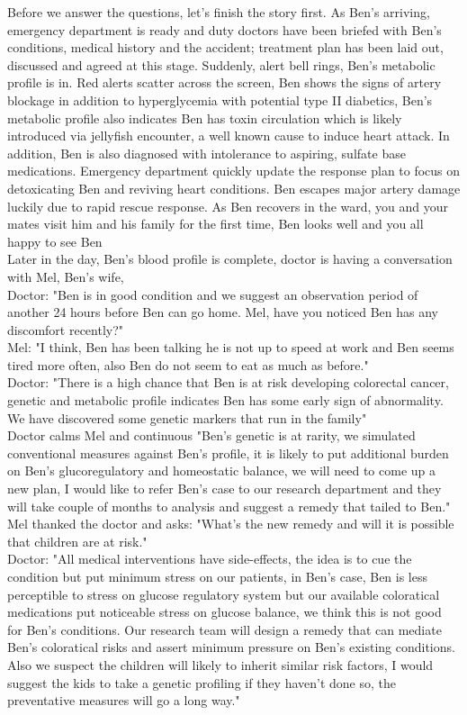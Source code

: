 Before we answer the questions, let's finish the story first. As Ben's arriving, emergency department is ready and duty doctors have been briefed with Ben's conditions, medical history and the accident; treatment plan has been laid out, discussed and agreed at this stage. Suddenly, alert bell rings, Ben's metabolic profile is in. Red alerts scatter across the screen, Ben shows the signs of artery blockage in addition to hyperglycemia with potential type II diabetics, Ben's metabolic profile also indicates Ben has toxin circulation which is likely introduced via jellyfish encounter, a well known cause to induce heart attack. In addition, Ben is also diagnosed with intolerance to aspiring, sulfate base medications. Emergency department quickly update the response plan to focus on  detoxicating Ben and reviving heart conditions. Ben escapes major artery damage luckily due to rapid rescue response. As Ben recovers in the ward, you and your mates visit him and his family for the first time, Ben looks well and you all happy to see Ben \\
Later in the day, Ben's blood profile is complete, doctor is having a conversation with Mel, Ben's wife, \\
Doctor: "Ben is in good condition and we suggest an observation period of another 24 hours before Ben can go home. Mel, have you noticed Ben has any discomfort recently?" \\
Mel: "I think, Ben has been talking he is not up to speed at work and Ben seems tired more often, also Ben do not seem to eat as much as before." \\
Doctor: "There is a high chance that Ben is at risk developing colorectal cancer, genetic and metabolic profile indicates Ben has some early sign of abnormality. We have discovered some genetic markers that run in the family" \\
Doctor calms Mel and continuous "Ben's genetic is at rarity, we simulated conventional measures against Ben's profile, it is likely to put additional burden on Ben's glucoregulatory and homeostatic balance, we will need to come up a new plan, I would like to refer Ben's case to our research department and they will take couple of months to analysis and suggest a remedy that tailed to Ben." \\
Mel thanked the doctor and asks: "What's the new remedy and will it is possible that children are at risk." \\
Doctor: "All medical interventions have side-effects, the idea is to cue the condition but put minimum stress on our patients, in Ben's case, Ben is less perceptible to stress on glucose regulatory system but our available coloratical medications put noticeable stress on glucose balance, we think this is not good for Ben's conditions. Our research team will design a remedy that can mediate Ben's coloratical risks and assert minimum pressure on Ben's existing conditions. Also we suspect the children will likely to inherit similar risk factors, I would suggest the kids to take a genetic profiling if they haven't done so, the preventative measures will go a long way." \\
